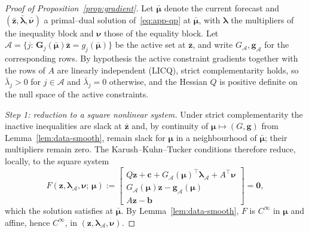 \documentclass[11pt]{article}
\theoremstyle{plain}
\theoremstyle{definition}
\begin{document}
\begin{proof}[Proof of Proposition~\ref{prop:gradient}]
	Let $\bar{\bm{\mu}}$ denote the current forecast and
	$(\bar{\bm{z}},\bar{\bm{\lambda}},\bar{\bm{\nu}})$ a primal--dual
	solution of~\eqref{eq:app-qp} at $\bar{\bm{\mu}}$, with
	$\bm{\lambda}$ the multipliers of the inequality block and
	$\bm{\nu}$ those of the equality block. Let
	$\mathcal{A}=\{j:\,\bm{G}_j(\bar{\bm{\mu}})\bar{\bm{z}}
		=g_j(\bar{\bm{\mu}})\}$ be the active set at
	$\bar{\bm{z}}$, and write $G_{\mathcal{A}},\bm{g}_{\mathcal{A}}$ for
	the corresponding rows. By hypothesis the active constraint
	gradients together with the rows of $A$ are linearly independent
	(LICQ), strict complementarity holds, so
	$\bar\lambda_j>0$ for $j\in\mathcal{A}$ and $\bar\lambda_j=0$
	otherwise, and the Hessian $Q$ is positive definite on the null
	space of the active constraints.

	\emph{Step 1: reduction to a square nonlinear system.} Under strict
	complementarity the inactive inequalities are slack at
	$\bar{\bm{z}}$ and, by continuity of
	$\bm{\mu}\mapsto(G,\bm{g})$ from Lemma~\ref{lem:data-smooth},
	remain slack for $\bm{\mu}$ in a neighbourhood of
	$\bar{\bm{\mu}}$; their multipliers remain zero. The
	Karush--Kuhn--Tucker conditions therefore reduce, locally, to the
	square system
	\begin{equation}
		\label{eq:app-kkt}
		F(\bm{z},\bm{\lambda}_{\mathcal{A}},\bm{\nu};\,\bm{\mu})
		:=
		\begin{bmatrix}
			Q\bm{z}+\bm{c}
			+G_{\mathcal{A}}(\bm{\mu})^{\top}\bm{\lambda}_{\mathcal{A}}
			+A^{\top}\bm{\nu}                                       \\[2pt]
			G_{\mathcal{A}}(\bm{\mu})\bm{z}-\bm{g}_{\mathcal{A}}(\bm{\mu}) \\[2pt]
			A\bm{z}-\bm{b}
		\end{bmatrix}
		=\bm{0},
	\end{equation}
	which the solution satisfies at $\bar{\bm{\mu}}$. By
	Lemma~\ref{lem:data-smooth}, $F$ is $C^{\infty}$ in $\bm{\mu}$ and
	affine, hence $C^{\infty}$, in
	$(\bm{z},\bm{\lambda}_{\mathcal{A}},\bm{\nu})$.


\end{proof}
\end{document}
